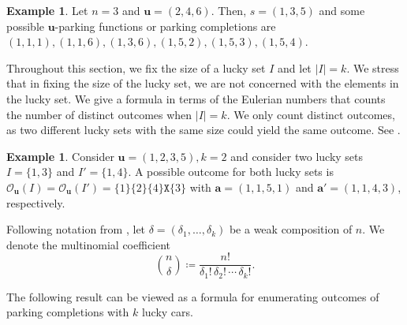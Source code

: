 \documentclass[reqno]{amsart}
\newcommand{\X}{\texttt{X}}
\theoremstyle{definition}
\newtheorem{example}[theorem]{Example}
\theoremstyle{remark}
\newcommand{\out}{\mathcal{O}}
\newcommand{\bsy}{\boldsymbol}
\begin{document}
\begin{example}
Let $n=3$ and $\bsy{u}=(2,4,6)$. Then, $s=(1,3,5)$ and some possible $\bsy{u}$-parking functions or parking completions are $(1, 1, 1),
 (1, 1, 6),
 (1, 3, 6),
 (1, 5, 2),
 (1, 5, 3),
 (1, 5, 4)$.
\end{example}

Throughout this section, we fix the size of a lucky set $I$ and let $|I|=k$. We stress that in fixing the size of the lucky set, we are not concerned with the elements in the lucky set. We give a formula in terms of the Eulerian numbers that counts the number of distinct outcomes when $|I|=k$. We only count distinct outcomes, as two different lucky sets with the same size could yield the same outcome. See .

\begin{example}\label{ex: same outcome}
Consider $\bsy{u}=(1,2,3,5), k=2$ and consider two lucky sets $I=\{1,3\}$ and $I'=\{1,4\}$. A possible outcome for both lucky sets is $\out_{\bsy{u}}(I)=\out_{\bsy{u}}(I')=\{1\}\{2\}\{4\}\X\{3\}$ with $\bsy{a}=(1,1,5,1)$ and $\bsy{a'}=(1,1,4,3)$, respectively. 
\end{example}



Following notation from \cite{diazlopez2017descentpolynomials}, let $\delta = (\delta_1, \ldots, \delta_k)$ be a weak composition of $n$. We denote the multinomial coefficient \[\binom{n }{ \delta} \coloneqq \frac{n!}{\delta_1!\, \delta_2 ! \,\cdots\, \delta_k!}.\] 


The following result can be viewed as a formula for enumerating outcomes of parking completions with $k$ lucky cars.
\end{document}
